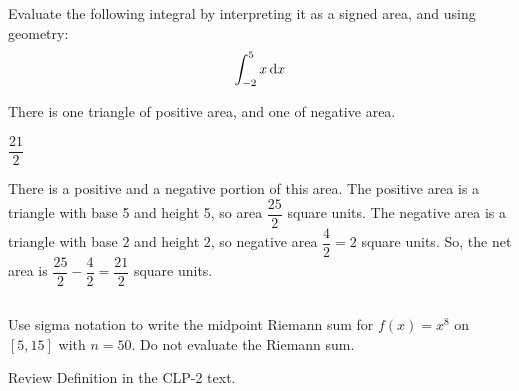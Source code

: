 \begin{Mquestion}
Evaluate the following integral by interpreting it as a signed area, and using geometry:
\[\int_{-2}^5 x \,\mathrm{d}x\]
\end{Mquestion}
\begin{hint} There is one triangle of positive area, and one of negative area.
\end{hint}
\begin{answer}
$\dfrac{21}{2}$
\end{answer}
\begin{solution}

There is a positive and a negative portion of this area. The positive area is a triangle with base 5 and height 5, so area $\dfrac{25}{2}$ square units. The negative area is a triangle with base $2$ and height $2$, so negative area $\dfrac{4}{2}=2$ square units. So, the net area is $\dfrac{25}{2}-\dfrac{4}{2}=\dfrac{21}{2}$ square units.
\begin{center}
\end{center}
\end{solution}




\subsection*{\Procedural}

\begin{question}[M105 2014A]
Use sigma notation to write the midpoint Riemann sum for $f(x)=x^8$ on $[5,15]$
with $n=50$. Do not evaluate the Riemann sum.
\end{question}

\begin{hint}
Review Definition   in the
CLP-2 text.
\end{hint}

